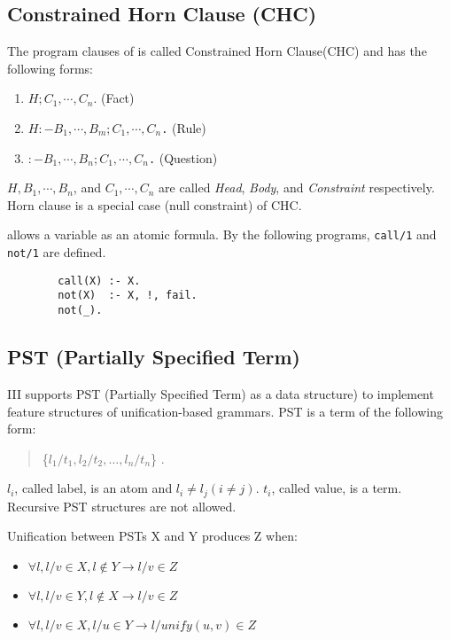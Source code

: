 \subsection{Constrained Horn Clause (CHC)}
The program clauses of \cuprolog is called Constrained Horn Clause(CHC) 
and has the following forms:
\begin{enumerate}
\item {\tt $H; C_{1},\cdots, C_{n}.$} \hfill (Fact)
\item {\tt $H:-B_{1},\cdots, B_{m}; C_{1},\cdots, C_{n}$.} \hfill (Rule)
\item {\tt $:-B_{1},\cdots, B_{n}; C_{1},\cdots, C_{n}$.} \hfill (Question)
\end{enumerate}

{\tt $H,B_{1},\cdots, B_{n}$}, and {\tt $C_{1},\cdots, C_{n}$} are 
called {\it Head}, {\it Body}, and {\it Constraint} respectively.
Horn clause is a special case (null constraint) of CHC.

 \cuprolog allows a variable as an atomic formula.
By the following programs, {\tt call/1} and {\tt not/1} are defined.

\begin{verbatim}
        call(X) :- X.
        not(X)  :- X, !, fail.
        not(_).
\end{verbatim}

\subsection{PST (Partially Specified Term)}
 \cuprolog III supports PST (Partially Specified Term) as a
data structure) to implement feature structures of unification-based
grammars.
PST is a term of the following form:
\begin{quote}
 \{$l_{1}/t_{1},l_{2}/t_{2},\ldots, l_{n}/t_{n}$\} .
\end{quote}
$l_{i}$, called {\sf label}, is an atom and $l_{i} \neq l_{j} (i \neq
j)$.
$t_{i}$, called {\sf value}, is a term.  
Recursive PST structures are not allowed.

Unification between PSTs X and Y produces Z when:
\begin{itemize}
\item $\forall l, l/v \in X, l \not\in Y \rightarrow l/v \in Z$
\item $\forall l, l/v \in Y, l \not\in X \rightarrow l/v \in Z$
\item $\forall l, l/v \in X, l/u \in Y \rightarrow l/unify(u,v) \in Z$
\end{itemize}

